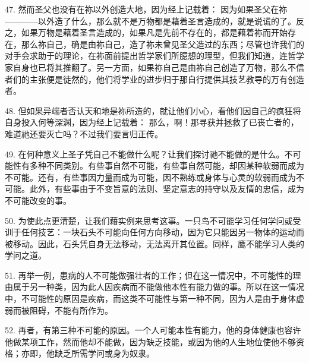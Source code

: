47. 然而圣父也没有在祢以外创造大地，因为经上记载着： 因为如果圣父在祢————以外造了什么，那么就不是万物都是藉着圣言造成的，就是说谎的了。反之，如果万物是藉着圣言造成的，如果凡是先前不存在的，都是藉着祢而开始存在，那么祢自己，确是由祢自己，造了祢未曾见圣父造过的东西；尽管也许我们的对手会求助于的理论，在祢面前提出哲学家们所臆想的理型，但我们知道，连哲学家自身也已将其推翻了。另一方面，如果祢自己是由祢自己创造了万物，那么不信者们的主张便是徒然的，他们将学业的进步归于那自行提供其技艺教导的万有创造者。\par

48. 但如果异端者否认天和地是祢所造的，就让他们小心，看他们因自己的疯狂将自身投入何等深渊，因为经上记载着：  那么，啊！那寻获并拯救了已丧亡者的，难道祂还要灭亡吗？不过我们要言归正传。\par

\par

49. 在何种意义上圣子凭自己不能做什么呢？让我们探讨祂不能做的是什么。不可能性有多种不同类别。有些事自然不可能，有些事自然可能，却因某种软弱而成为不可能。还有，有些事因力量而成为可能，因不熟练或身体与心灵的软弱而成为不可能。此外，有些事由于不变旨意的法则、坚定意志的持守以及友情的忠信，成为不可能改变的事。\par

50. 为使此点更清楚，让我们藉实例来思考这事。一只鸟不可能学习任何学问或受训于任何技艺：一块石头不可能向任何方向移动，因为它只能因另一物体的运动而被移动。因此，石头凭自身无法移动，无法离开其位置。同样，鹰不能学习人类的学问之道。\par

51. 再举一例，患病的人不可能做强壮者的工作；但在这一情况中，不可能性的理由属于另一种类，因为此人因疾病而不能做他本性有能力做的事。所以在这一情况中，不可能性的原因是疾病，而这类不可能性与第一种不同，因为人是由于身体虚弱而被阻碍，不能有所作为。\par

52. 再者，有第三种不可能的原因。一个人可能本性有能力，他的身体健康也容许他做某项工作，然而他却不能做，因为缺乏技能，或因为他的人生地位使他不够资格；亦即，他缺乏所需学问或身为奴隶。\par

